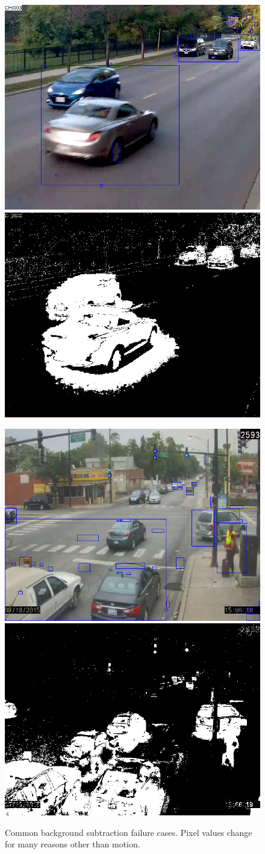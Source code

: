 \begin{figure}[!htbp]
\begin{minipage}{0.9\columnwidth}
    \end{minipage}
    \vfill
    \begin{minipage}{0.9\columnwidth}
        \includegraphics[width=0.48\linewidth, height = 0.3\linewidth]{./img/bg/ILCHI_CHI003.png}
        \includegraphics[width=0.48\linewidth, height = 0.3\linewidth]{./img/bg/ILCHI_CHI003_FG.png}  
        \label{subfig:bg-occlusion}
    \end{minipage}
    \hspace{0.02\columnwidth}
    \begin{minipage}{0.9\columnwidth}
        \includegraphics[width=0.48\linewidth, height = 0.3\linewidth]{./img/bg/halsted.png}
        \includegraphics[width=0.48\linewidth, height = 0.3\linewidth]{./img/bg/halsted_FG.png}  
        \label{subfig:bg-ghost}
    \end{minipage}
    \caption{Common background subtraction failure cases. Pixel values change for many reasons other than motion.}
    \label{fig:tracker-bg}
\end{figure}